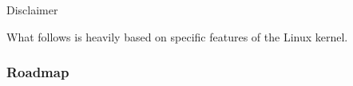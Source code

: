 \documentclass{beamer}
\begin{document}
\frame{\titlepage}

\begin{frame}{Disclaimer}
\begin{block}{}
  \centering
  What follows is heavily based on specific features of the Linux kernel.\\
\end{block}
\end{frame}

\begin{frame}
\frametitle{Roadmap}
\tableofcontents
\end{frame}






\end{document}
